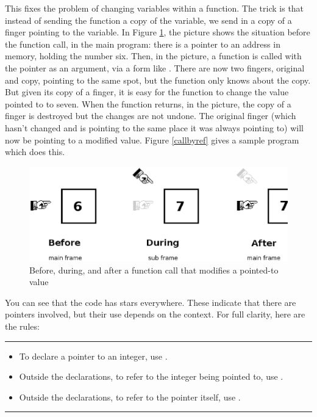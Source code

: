 \documentclass[12pt]{article}
\begin{document}
This fixes the problem of changing variables within a function. The
trick is that instead of sending the function a copy of the variable,
we send in a copy of a finger pointing to the variable. 
In Figure \ref{fingerfig}, the  picture shows the situation
before the function call, in the main program: there is a pointer to an
address in memory, holding the number six. Then, in the  picture,
a function is called with the pointer as an argument, via a form like
.
There are now
two fingers, original and copy, pointing to the same spot, but the
function only knows about the copy.  But given its copy of a finger, it
is easy for the function to change the value pointed to to seven. When
the function returns, in the  picture, the copy of a finger is
destroyed but the changes are not undone.  The original finger (which
hasn't changed and is pointing to the same place it was always pointing
to) will now be pointing to a modified value.  Figure \ref{callbyref}
gives a sample program which does this.


\begin{figure}
\hskip -1cm
\includegraphics[width=\textwidth*\real{1.1}]{finger.ps}
\caption{Before, during, and after a function call that modifies a pointed-to value}
\label{fingerfig}
\end{figure}

\lstset{numbers=left, numberstyle=\scshape}
\lstset{numbers=none}

You can see that the code has stars everywhere. These
indicate that there are pointers involved, but their use depends on the
context.
For full clarity, here are the rules:
\vspace \baselineskip
\hrule
\vspace \baselineskip
\begin{itemize}
\item To declare a pointer to an integer, use .
\item Outside the declarations, to refer to the integer being pointed to, use .
\item Outside the declarations, to refer to the pointer itself, use
.
\end{itemize}
\vspace \baselineskip
\hrule
\vspace \baselineskip
\end{document}
